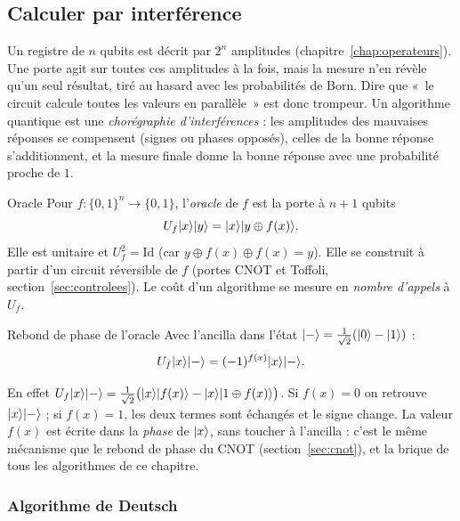 \subsection{Calculer par interférence}\label{sec:interference}

Un registre de $n$ qubits est décrit par $2^n$ amplitudes (chapitre~\ref{chap:operateurs}). Une porte
agit sur toutes ces amplitudes à la fois, mais la mesure n'en révèle qu'un seul résultat, tiré au
hasard avec les probabilités de Born. Dire que «~le circuit calcule toutes les valeurs en parallèle~»
est donc trompeur. Un algorithme quantique est une \emph{chorégraphie d'interférences} : les
amplitudes des mauvaises réponses se compensent (signes ou phases opposés), celles de la bonne
réponse s'additionnent, et la mesure finale donne la bonne réponse avec une probabilité proche de $1$.

\begin{definition}{Oracle}
Pour $f:\{0,1\}^n\to\{0,1\}$, l'\emph{oracle} de $f$ est la porte à $n+1$ qubits
\[
  U_f|x\rangle|y\rangle=|x\rangle|y\oplus f(x)\rangle.
\]
Elle est unitaire et $U_f^2=\mathrm{Id}$ (car $y\oplus f(x)\oplus f(x)=y$). Elle se construit à partir
d'un circuit réversible de $f$ (portes CNOT et Toffoli, section~\ref{sec:controlees}). Le coût d'un
algorithme se mesure en \emph{nombre d'appels} à $U_f$.
\end{definition}

\begin{resultat}{Rebond de phase de l'oracle}
Avec l'ancilla dans l'état $|-\rangle=\frac{1}{\sqrt2}(|0\rangle-|1\rangle)$ :
\[
  U_f|x\rangle|-\rangle=(-1)^{f(x)}|x\rangle|-\rangle.
\]
\end{resultat}

En effet $U_f|x\rangle|-\rangle=\frac{1}{\sqrt2}\big(|x\rangle|f(x)\rangle-|x\rangle|1\oplus f(x)\rangle\big)$.
Si $f(x)=0$ on retrouve $|x\rangle|-\rangle$ ; si $f(x)=1$, les deux termes sont échangés et le signe
change. La valeur $f(x)$ est écrite dans la \emph{phase} de $|x\rangle$, sans toucher à l'ancilla : c'est
le même mécanisme que le rebond de phase du CNOT (section~\ref{sec:cnot}), et la brique de tous les
algorithmes de ce chapitre.

\subsubsection{Algorithme de Deutsch}

